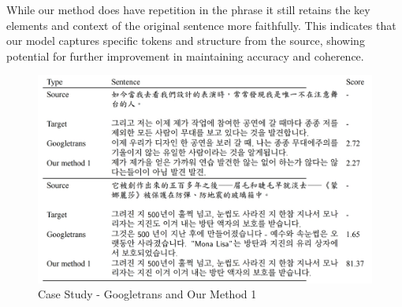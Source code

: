 \documentclass[PhD]{PHlab-thesis}
\begin{document}
While our method does have repetition in the phrase  it still retains the key elements and context of the original sentence more faithfully. This indicates that our model captures specific tokens and structure from the source, showing potential for further improvement in maintaining accuracy and coherence.

\begin{figure}[h!]
  \centering
  \includegraphics[width=\linewidth]{tab_5_1.jpg}
  \captionsetup{type=table}
  \caption{Case Study - Googletrans and Our Method 1}
  \label{tab:Case Study - Googletrans and Our Method 1}
\end{figure}
\end{document}
